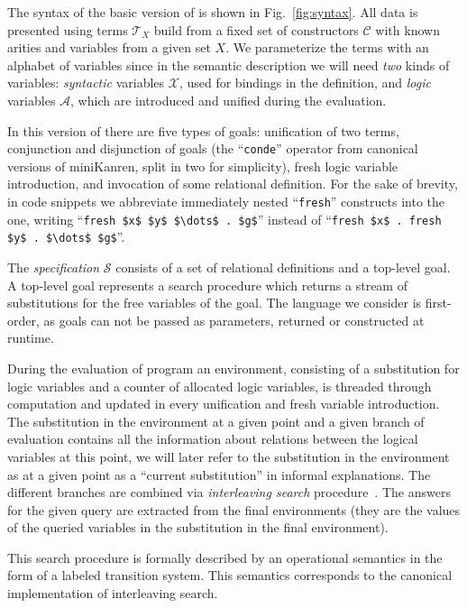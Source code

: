 The syntax of the basic version of \mK is shown in Fig.~\ref{fig:syntax}. 
All data is presented using terms $\mathcal{T}_X$ build from a fixed set of constructors $\mathcal{C}$ with known arities and variables
from a given set $X$.
We parameterize the terms with an alphabet of variables since in the semantic description we will need \emph{two} kinds of variables:
\emph{syntactic} variables $\mathcal{X}$, used for bindings in the definition, and \emph{logic} variables $\mathcal{A}$, which are
introduced and unified during the evaluation.

In this version of \mK there are five types of goals: unification of two terms, conjunction and disjunction of goals (the
``\lstinline|conde|'' operator from canonical versions of miniKanren, split in two for simplicity), fresh logic variable introduction, and
invocation of some relational definition. For the sake of brevity, in code snippets we abbreviate immediately nested ``\lstinline|fresh|''
constructs into the one, writing ``\lstinline|fresh $x$ $y$ $\dots$ . $g$|'' instead of
``\lstinline|fresh $x$ . fresh $y$ . $\dots$ $g$|''.

The \emph{specification} $\mathcal{S}$ consists of a set of relational definitions and a top-level goal.
A top-level goal represents a search procedure which returns a stream of substitutions for the free variables of the goal.
The language we consider is first-order, as goals can not be passed as parameters, returned or constructed at runtime.

During the evaluation of \mK program an environment, consisting of a substitution for logic variables and a counter of allocated logic
variables, is threaded through computation and updated in every unification and fresh variable introduction.
The substitution in the environment at a given point and a given branch of evaluation contains all the information about relations between
the logical variables at this point, we will later refer to the substitution in the environment as at a given point as a ``current substitution''
in informal explanations.
The different branches are combined via \emph{interleaving search} procedure~\cite{InterleavingSearch}.
The answers for the given query are extracted from the final environments (they are the values of the queried variables in the substitution
in the final environment).

This search procedure is formally described by an operational semantics in the form of a labeled transition system.
This semantics corresponds to the canonical implementation of interleaving search. 

